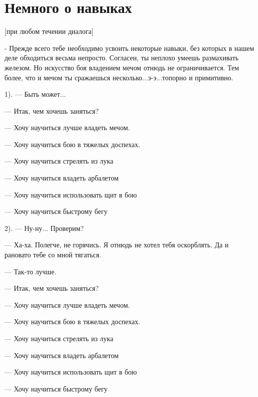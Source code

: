 \documentclass[12pt,a4paper]{book}
\begin{document}
\section*{Немного о навыках}

[при любом течении диалога]

- Прежде всего тебе необходимо усвоить некоторые навыки, без которых в нашем деле обходиться весьма непросто. Согласен, ты неплохо умеешь размахивать железом. Но искусство боя владением мечом отнюдь не ограничивается. Тем более, что и мечом ты сражаешься несколько...э-э...топорно и примитивно. 

1). --- Быть может...

--- Итак, чем хочешь заняться?

--- Хочу научиться лучше владеть мечом.

--- Хочу научиться бою в тяжелых доспехах.

--- Хочу научиться стрелять из лука

--- Хочу научиться владеть арбалетом

--- Хочу научиться использовать щит в бою

--- Хочу научиться быстрому бегу

2). --- Ну-ну... Проверим?

--- Ха-ха. Полегче, не горячись. Я отнюдь не хотел тебя оскорблять. Да и рановато тебе со мной тягаться.

--- Так-то лучше.

--- Итак, чем хочешь заняться?

--- Хочу научиться лучше владеть мечом.

--- Хочу научиться бою в тяжелых доспехах.

--- Хочу научиться стрелять из лука

--- Хочу научиться владеть арбалетом

--- Хочу научиться использовать щит в бою

--- Хочу научиться быстрому бегу
\end{document}
